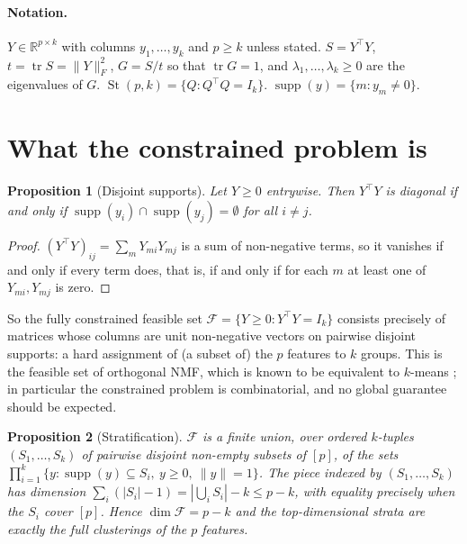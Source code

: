 \documentclass[11pt]{article}
\newtheorem{proposition}{Proposition}
\theoremstyle{definition}
\DeclareMathOperator{\tr}{tr}
\DeclareMathOperator{\supp}{supp}
\DeclareMathOperator{\st}{St}
\newcommand{\R}{\mathbb{R}}
\newcommand{\norm}[1]{\lVert #1 \rVert}
\newcommand{\Fnorm}[1]{\lVert #1 \rVert_F}
\begin{document}
\paragraph{Notation.} $Y \in \R^{p\times k}$ with columns $y_1,\dots,y_k$ and
$p \ge k$ unless stated. $S = Y^\top Y$, $t = \tr S = \Fnorm{Y}^2$,
$G = S/t$ so that $\tr G = 1$, and $\lambda_1,\dots,\lambda_k \ge 0$ are the
eigenvalues of $G$. $\st(p,k) = \{Q : Q^\top Q = I_k\}$.
$\supp(y) = \{m : y_m \neq 0\}$.

\section{What the constrained problem is}\label{sec:target}

\begin{proposition}[Disjoint supports]\label{prop:disjoint}
Let $Y \ge 0$ entrywise. Then $Y^\top Y$ is diagonal if and only if
$\supp(y_i) \cap \supp(y_j) = \emptyset$ for all $i \neq j$.
\end{proposition}
\begin{proof}
$(Y^\top Y)_{ij} = \sum_m Y_{mi}Y_{mj}$ is a sum of non-negative terms, so it
vanishes if and only if every term does, that is, if and only if for each $m$ at
least one of $Y_{mi}, Y_{mj}$ is zero.
\end{proof}

So the fully constrained feasible set
$\mathcal{F} = \{Y \ge 0 : Y^\top Y = I_k\}$
consists precisely of matrices whose columns are unit non-negative vectors on
pairwise disjoint supports: a hard assignment of (a subset of) the $p$ features
to $k$ groups. This is the feasible set of orthogonal NMF, which is known to be
equivalent to $k$-means \citep{ding2006,choi2008,pompili2014}; in particular the
constrained problem is combinatorial, and no global guarantee should be expected.

\begin{proposition}[Stratification]\label{prop:strata}
$\mathcal{F}$ is a finite union, over ordered $k$-tuples $(S_1,\dots,S_k)$ of
pairwise disjoint non-empty subsets of $[p]$, of the sets
$\prod_{i=1}^k \{y : \supp(y) \subseteq S_i,\ y \ge 0,\ \norm{y} = 1\}$.
The piece indexed by $(S_1,\dots,S_k)$ has dimension
$\sum_i (|S_i| - 1) = |\bigcup_i S_i| - k \le p-k$, with equality precisely when
the $S_i$ cover $[p]$. Hence $\dim \mathcal{F} = p-k$ and the top-dimensional
strata are exactly the full clusterings of the $p$ features.
\end{proposition}
\end{document}
